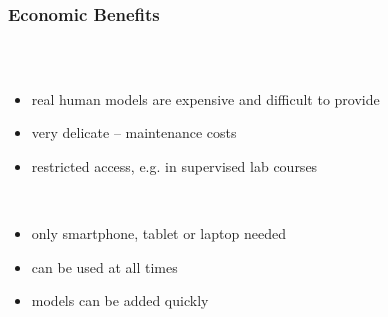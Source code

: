 \begin{frame}
  \frametitle{Economic Benefits}
  \begin{columns}
    \begin{column}{0.8\textwidth}
      \begin{description}[]
        \item[Costs of ordinary teaching] \hfill \\
        \begin{itemize}
          \item real human models are expensive and difficult to provide
          \item very delicate -- maintenance costs
          \item restricted access, e.g. in supervised lab courses
        \end{itemize}

        \bigskip
        \item[Costs using our application] \hfill \\
          \begin{itemize}
            \item only smartphone, tablet or laptop needed
            \item can be used at all times
            \item models can be added quickly
        \end{itemize}
      \end{description}
    \end{column}


\end{columns}
\end{frame}
